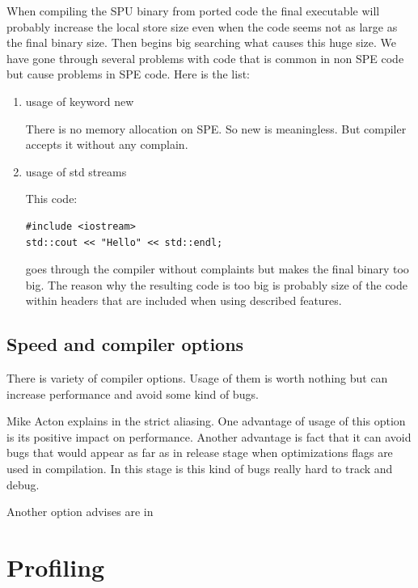 \par
When compiling the SPU binary from ported code the final executable will probably increase the local store size even when the code seems not as large as the final binary size.
Then begins big searching what causes this huge size.
We have gone through several problems with code that is common in non SPE code but cause problems in SPE code.
Here is the list:
\begin{enumerate}
\item usage of keyword new
\par
There is no memory allocation on SPE. So new is meaningless.
But compiler accepts it without any complain.

\item usage of std streams
\par
This code:
\begin{verbatim}
#include <iostream>
std::cout << "Hello" << std::endl;
\end{verbatim}
goes through the compiler without complaints but makes the final binary too big.
The reason why the resulting code is too big is probably size of the code within headers that are included when using described features.

\end{enumerate}

\subsection {Speed and compiler options}

\par
There is variety of compiler options.
Usage of them is worth nothing but can increase performance and avoid some kind of bugs.

\par
Mike Acton explains in \cite{strictAliasing} the strict aliasing.
One advantage of usage of this option is its positive impact on performance.
Another advantage is fact that it can avoid bugs that would appear as far as in release stage when optimizations flags are used in compilation.
In this stage is this kind of bugs really hard to track and debug.

\par
Another option advises are in \cite{compilerOptions}

\section{Profiling}

